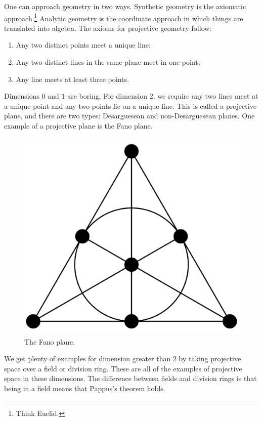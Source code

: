 \documentclass [11 pt, oneside] {article}
\begin{document}
One can approach geometry in two ways. Synthetic geometry is the axiomatic approach.\footnote{Think Euclid.} Analytic geometry is the coordinate approach in which things are translated into algebra. The axioms for projective geometry follow:
\begin{enumerate}
	\item Any two distinct points meet a unique line;
	\item Any two distinct lines in the same plane meet in one point;
	\item Any line meets at least three points.
\end{enumerate}
Dimensions $0$ and $1$ are boring. For dimension $2$, we require any two lines meet at a unique point and any two points lie on a unique line. This is called a projective plane, and there are two types: Desarguesean and non-Desarguesean planes. One example of a projective plane is the Fano plane. 
\begin{figure}
	\begin{center}
		\includegraphics[scale=0.1]{images/fano_plane.png}
		\caption{The Fano plane.}
	\end{center}
\end{figure}
We get plenty of examples for dimension greater than $2$ by taking projective space over a field or division ring. These are all of the examples of projective space in these dimensions. The difference between fields and division rings is that being in a field means that Pappus's theorem holds.
\end{document}
